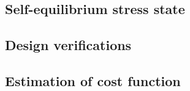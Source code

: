 \subsection{Self-equilibrium stress state} \label{sec:met_seq}

\subsection{Design verifications} \label{sec:met_ver}

\subsection{Estimation of cost function} \label{sec:met_cost}





